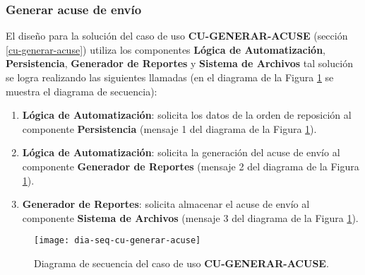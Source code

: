 \subsubsection{Generar acuse de envío}
El diseño para la solución del caso de uso \textbf{CU-GENERAR-ACUSE} (sección \ref{cu-generar-acuse}) utiliza los componentes \textbf{Lógica de Automatización}, \textbf{Persistencia}, \textbf{Generador de Reportes} y \textbf{Sistema de Archivos} tal solución se logra realizando las siguientes llamadas (en el diagrama de la Figura \ref{fig:dia-seq-cu-generar-acuse} se muestra el diagrama de secuencia):
\begin{enumerate}
	\item \textbf{Lógica de Automatización}: solicita los datos de la orden de reposición al componente \textbf{Persistencia} (mensaje 1 del diagrama de la Figura \ref{fig:dia-seq-cu-generar-acuse}).
	\item \textbf{Lógica de Automatización}: solicita la generación del acuse de envío al componente \textbf{Generador de Reportes} (mensaje 2 del diagrama de la Figura \ref{fig:dia-seq-cu-generar-acuse}).
	\item \textbf{Generador de Reportes}: solicita almacenar el acuse de envío al componente \textbf{Sistema de Archivos} (mensaje 3 del diagrama de la Figura \ref{fig:dia-seq-cu-generar-acuse}).
\end{enumerate}

\begin{figure}[h]
	\centering
	\texttt{[image: dia-seq-cu-generar-acuse]}
	\caption{Diagrama de secuencia del caso de uso \textbf{CU-GENERAR-ACUSE}.}
	\label{fig:dia-seq-cu-generar-acuse}
\end{figure}

